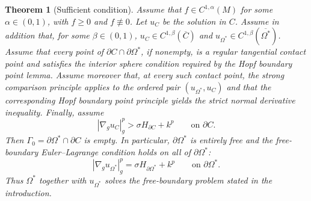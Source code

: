 \documentclass{article}
\renewcommand{\boxed}[1]{#1}
\newtheorem{theorem}{Theorem}[section]
\begin{document}
\begin{theorem}[Sufficient condition]
\label{thm:sufficient-condition}
Assume that $f\in C^{1,\alpha}(M)$ for some $\alpha\in(0,1)$, with
$f\geq0$ and $f\not\equiv0$. Let $u_C$ be the solution in $C$.
Assume in addition that, for some $\beta\in(0,1)$,
$u_C\in C^{1,\beta}(\overline C)$ and
$u_{\Omega^*}\in C^{1,\beta}(\overline{\Omega^*})$.
Assume that every point of $\partial C\cap\partial\Omega^*$, if nonempty,
is a regular tangential contact point and satisfies the interior sphere
condition required by the Hopf boundary point lemma.
Assume moreover that, at every such contact point, the strong
comparison principle applies to the ordered pair
$(u_{\Omega^*},u_C)$ and that the corresponding Hopf boundary point
principle yields the strict normal derivative inequality.
Finally, assume
\[
\boxed{
|\nabla_g u_C|_g^p
>
\sigma H_{\partial C}+k^p
\qquad\text{on }\partial C.
}
\]
Then $\Gamma_0=\partial\Omega^*\cap\partial C$ is empty. In particular,
$\partial\Omega^*$ is entirely free and the free-boundary Euler--Lagrange
condition holds on all of $\partial\Omega^*$:
\[
\boxed{
|\nabla_g u_{\Omega^*}|_g^p
=
\sigma H_{\partial\Omega^*}+k^p
\qquad\text{on }\partial\Omega^*.
}
\]
Thus $\Omega^*$ together with $u_{\Omega^*}$ solves the free-boundary problem
stated in the introduction.
\end{theorem}
\end{document}

